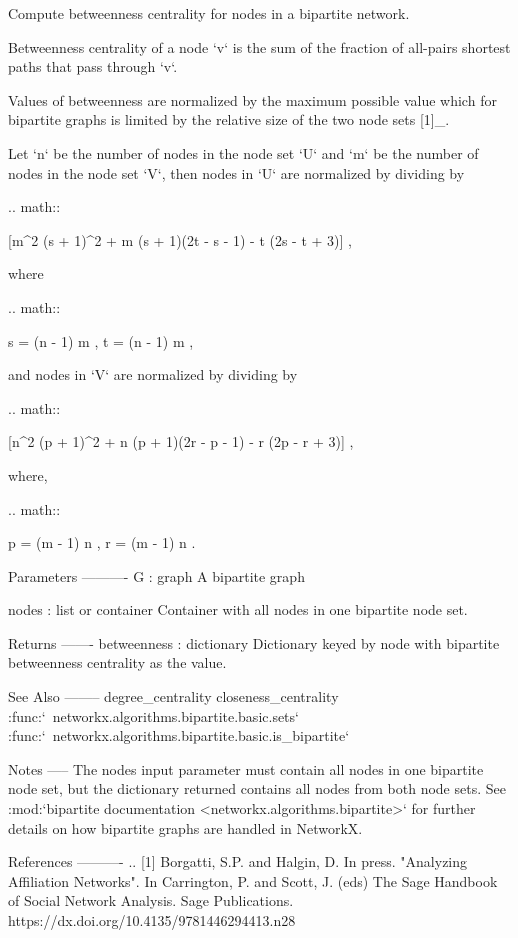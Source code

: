 \begin{DoxyVerb}Compute betweenness centrality for nodes in a bipartite network.

Betweenness centrality of a node `v` is the sum of the
fraction of all-pairs shortest paths that pass through `v`.

Values of betweenness are normalized by the maximum possible
value which for bipartite graphs is limited by the relative size
of the two node sets [1]_.

Let `n` be the number of nodes in the node set `U` and
`m` be the number of nodes in the node set `V`, then
nodes in `U` are normalized by dividing by

.. math::

    [m^2 (s + 1)^2 + m (s + 1)(2t - s - 1) - t (2s - t + 3)] ,

where

.. math::

    s = (n - 1) \div m , t = (n - 1) \mod m ,

and nodes in `V` are normalized by dividing by

.. math::

     [n^2 (p + 1)^2 + n (p + 1)(2r - p - 1) - r (2p - r + 3)] ,

where,

.. math::

    p = (m - 1) \div n , r = (m - 1) \mod n .

Parameters
----------
G : graph
    A bipartite graph

nodes : list or container
    Container with all nodes in one bipartite node set.

Returns
-------
betweenness : dictionary
    Dictionary keyed by node with bipartite betweenness centrality
    as the value.

See Also
--------
degree_centrality
closeness_centrality
:func:`~networkx.algorithms.bipartite.basic.sets`
:func:`~networkx.algorithms.bipartite.basic.is_bipartite`

Notes
-----
The nodes input parameter must contain all nodes in one bipartite node set,
but the dictionary returned contains all nodes from both node sets.
See :mod:`bipartite documentation <networkx.algorithms.bipartite>`
for further details on how bipartite graphs are handled in NetworkX.


References
----------
.. [1] Borgatti, S.P. and Halgin, D. In press. "Analyzing Affiliation
    Networks". In Carrington, P. and Scott, J. (eds) The Sage Handbook
    of Social Network Analysis. Sage Publications.
    https://dx.doi.org/10.4135/9781446294413.n28
\end{DoxyVerb}
 \mbox{\label{namespacenetworkx_1_1algorithms_1_1bipartite_1_1centrality_af8d12405f1ad5f68f8d32f71e32fea4a}} 
